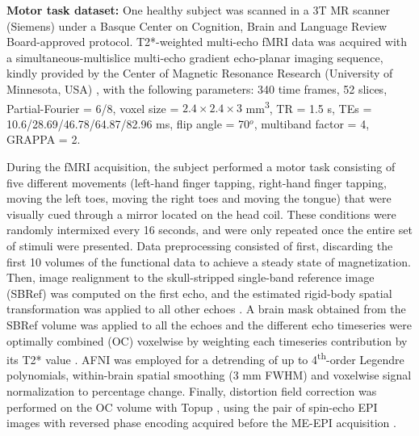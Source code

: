 \textbf{Motor task dataset:} One healthy subject was scanned in a 3T
MR scanner (Siemens) under a Basque Center on Cognition, Brain and
Language Review Board-approved protocol. T2*-weighted multi-echo fMRI data was
acquired with a simultaneous-multislice multi-echo gradient echo-planar imaging
sequence, kindly provided by the Center of Magnetic Resonance Research
(University of Minnesota, USA)
\citep{Feinberg2010MultiplexedEchoPlanar,Moeller2010MultibandmultisliceGE,Setsompop2011Blippedcontrolledaliasing},
with the following parameters: 340 time frames, 52 slices, Partial-Fourier =
6/8, voxel size = $2.4\times2.4\times3$ mm\textsuperscript{3}, TR = 1.5 s, TEs =
10.6/28.69/46.78/64.87/82.96 ms, flip angle = 70\(^o\), multiband factor = 4,
GRAPPA = 2.

During the fMRI acquisition, the subject performed a motor task consisting of
five different movements (left-hand finger tapping, right-hand finger tapping,
moving the left toes, moving the right toes and moving the tongue) that were
visually cued through a mirror located on the head coil. These conditions were
randomly intermixed every 16 seconds, and were only repeated once the entire set
of stimuli were presented. Data preprocessing consisted of first, discarding the
first 10 volumes of the functional data to achieve a steady state of
magnetization. Then, image realignment to the skull-stripped single-band
reference image (SBRef) was computed on the first echo, and the estimated
rigid-body spatial transformation was applied to all other echoes
\citep{Jenkinson2012FSL,Jenkinson2001globaloptimisationmethod}. A brain mask
obtained from the SBRef volume was applied to all the echoes and the different
echo timeseries were optimally combined (OC) voxelwise by weighting each
timeseries contribution by its T2* value
\citep{Posse1999EnhancementBOLDcontrast}. AFNI
\citep{Cox1996AFNISoftwareAnalysis} was employed for a detrending of up to
4\textsuperscript{th}-order Legendre polynomials, within-brain spatial smoothing
(3 mm FWHM) and voxelwise signal normalization to percentage change. Finally,
distortion field correction was performed on the OC volume with Topup
\citep{Andersson2003Howcorrectsusceptibility}, using the pair of spin-echo EPI
images with reversed phase encoding acquired before the ME-EPI acquisition
\citep{Glasser2016HumanConnectomeProjects}.

